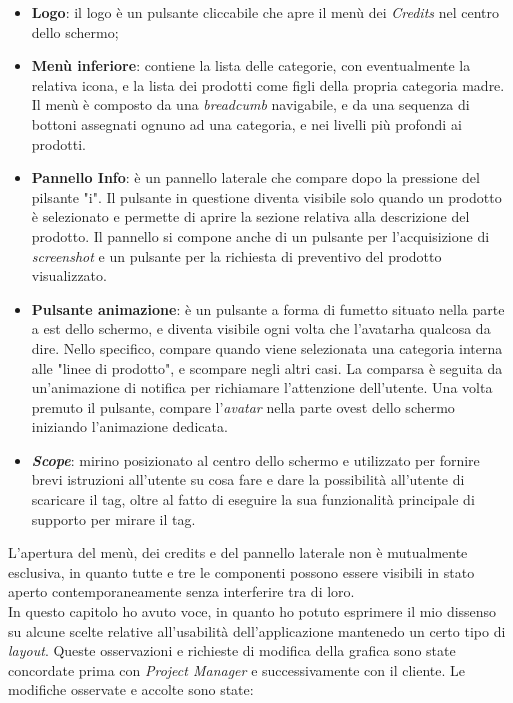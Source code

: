 \begin{itemize}
	\item \textbf{Logo}: il logo \`e un pulsante cliccabile che apre il men\`u dei \textit{Credits} nel centro dello schermo;
	\item \textbf{Men\`u inferiore}: contiene la lista delle categorie, con eventualmente la relativa icona, e la lista dei prodotti come figli della propria categoria madre. Il men\`u \`e composto da una \textit{breadcumb} navigabile, e da una sequenza di bottoni assegnati ognuno ad una categoria, e nei livelli pi\`u profondi ai prodotti.
	\item \textbf{Pannello Info}: \`e un pannello laterale che compare dopo la pressione del pilsante "i". Il pulsante in questione diventa visibile solo quando un prodotto \`e selezionato e permette di aprire la sezione relativa alla descrizione del prodotto. Il pannello si compone anche di un pulsante per l'acquisizione di \textit{screenshot} e un pulsante per la richiesta di preventivo del prodotto visualizzato.
	\item \textbf{Pulsante animazione}: \`e un pulsante a forma di fumetto situato nella parte a est dello schermo, e diventa visibile ogni volta che l'avatar\gloss ha qualcosa da dire. Nello specifico, compare quando viene selezionata una categoria interna alle "linee di prodotto", e scompare negli altri casi. La comparsa \`e seguita da un'animazione di notifica per richiamare l'attenzione dell'utente. Una volta premuto il pulsante, compare l'\textit{avatar\gloss} nella parte ovest dello schermo iniziando l'animazione dedicata.
	\item \textbf{\textit{Scope}}: mirino posizionato al centro dello schermo e utilizzato per fornire brevi istruzioni all'utente su cosa fare e dare la possibilit\`a all'utente di scaricare il tag, oltre al fatto di eseguire la sua funzionalit\`a principale di supporto per mirare il tag.
\end{itemize}
\noindent
L'apertura del men\`u, dei credits e del pannello laterale non \`e mutualmente esclusiva, in quanto tutte e tre le componenti possono essere visibili in stato aperto contemporaneamente senza interferire tra di loro.\\

\noindent
In questo capitolo ho avuto voce, in quanto ho potuto esprimere il mio dissenso su alcune scelte relative all'usabilit\`a dell'applicazione mantenedo un certo tipo di \textit{layout}. Queste osservazioni e richieste di modifica della grafica sono state concordate prima con \textit{Project Manager} e successivamente con il cliente. Le modifiche osservate e accolte sono state:

